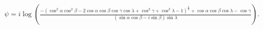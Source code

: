 \documentclass[preview]{standalone}
\begin{document}
\begin{align*}
\psi = i \log\left( \frac{ -(\cos^{2}{\alpha } \cos^{2}{\beta } - 2 \cos{\alpha } \cos{\beta } \cos{\gamma } \cos{\lambda } + \cos^{2}{\gamma } + \cos^{2}{\lambda } - 1)^{\frac{1}{2}} + \cos{\alpha } \cos{\beta } \cos{\lambda } - \cos{\gamma } } { (\sin{\alpha } \cos{\beta } - i \sin{\beta }) \sin{\lambda } } \right).
\end{align*}
\end{document}
